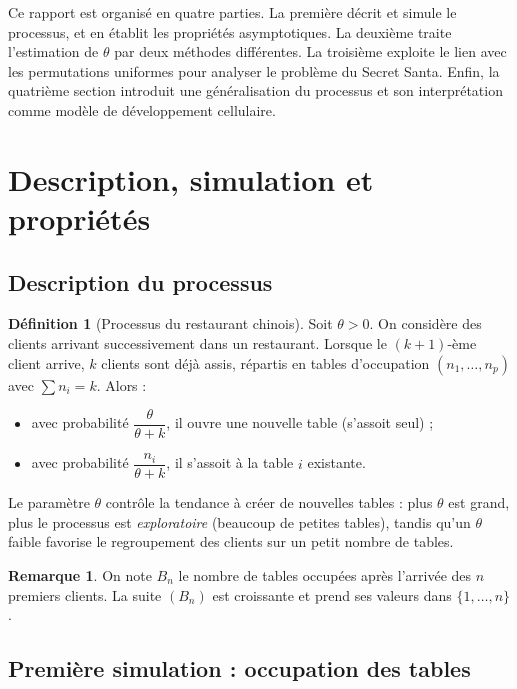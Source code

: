 \documentclass[12pt, a4paper]{article}
\theoremstyle{definition}
\newtheorem{definition}{Définition}[section]
\newtheorem{remarque}{Remarque}[section]
\theoremstyle{plain}
\begin{document}
Ce rapport est organisé en quatre parties. La première décrit et simule le processus, et en
établit les propriétés asymptotiques. La deuxième traite l'estimation de $\theta$ par deux
méthodes différentes. La troisième exploite le lien avec les permutations uniformes pour
analyser le problème du Secret Santa. Enfin, la quatrième section introduit une généralisation
du processus et son interprétation comme modèle de développement cellulaire.

\section{Description, simulation et propriétés}

\subsection{Description du processus}

\begin{definition}[Processus du restaurant chinois]
Soit $\theta > 0$. On considère des clients arrivant successivement dans un restaurant.
Lorsque le $(k+1)$-ème client arrive, $k$ clients sont déjà assis, répartis en tables
d'occupation $(n_1, \ldots, n_p)$ avec $\sum n_i = k$. Alors :
\begin{itemize}
  \item avec probabilité $\dfrac{\theta}{\theta + k}$, il ouvre une nouvelle table (s'assoit seul) ;
  \item avec probabilité $\dfrac{n_i}{\theta + k}$, il s'assoit à la table $i$ existante.
\end{itemize}
\end{definition}

Le paramètre $\theta$ contrôle la tendance à créer de nouvelles tables : plus $\theta$ est
grand, plus le processus est \emph{exploratoire} (beaucoup de petites tables), tandis qu'un
$\theta$ faible favorise le regroupement des clients sur un petit nombre de tables.

\begin{remarque}
  On note $B_n$ le nombre de tables occupées après l'arrivée des $n$ premiers clients.
  La suite $(B_n)$ est croissante et prend ses valeurs dans $\{1, \ldots, n\}$.
\end{remarque}

\subsection{Première simulation : occupation des tables}
\end{document}
